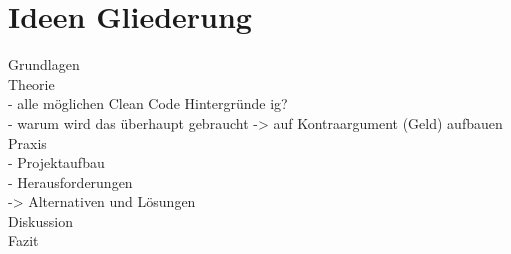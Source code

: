\chapter{Ideen Gliederung}

\noindent
Grundlagen\\

\noindent
Theorie\\
- alle möglichen Clean Code Hintergründe ig?\\
- warum wird das überhaupt gebraucht
   -> auf Kontraargument (Geld) aufbauen\\

\noindent
Praxis\\
- Projektaufbau\\
- Herausforderungen\\
   -> Alternativen und Lösungen\\

\noindent
Diskussion\\

\noindent
Fazit\\